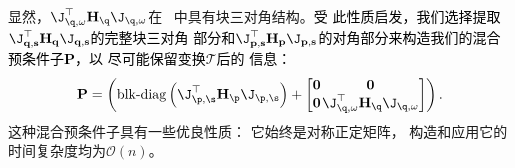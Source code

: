 显然，$ \J_{\q,\omega}^\top \mathbf{H}_\q \J_{\q, \omega}$在
~中具有块三对角结构。\textcolor{black}{受
此性质启发，我们选择提取$\J_{\mathbf{q, s}}^{\top} \mathbf{H}_{\mathbf{q}} \J_{\mathbf{q, s}}$的完整块三对角
部分和$\J^{\top}_{\mathbf{p, s}} \mathbf{H}_{\mathbf{p}} \J_{\mathbf{p, s}}$的对角部分来构造我们的混合预条件子$\mathbf P$，以
尽可能保留变换$\mathcal T$后的
信息：}
\begin{equation}
  \setlength{\arraycolsep}{0.5pt}
  \mathbf{P} =\left(\operatorname{blk-diag}\left(\J_{\p, \s}^\top \mathbf{H}_{\p} \J_{\p, \s}\right) + \begin{bmatrix} \mathbf{0} & \mathbf{0} \\ \mathbf{0}  & \J_{\q,\omega}^\top \mathbf{H}_\q \J_{\q, \omega} \end{bmatrix}\right).
  \label{eq:preconditioner_structure}
\end{equation}
这种混合预条件子具有一些优良性质：
它始终是对称正定矩阵，
构造和应用它的时间复杂度均为$\mathcal{O}(n)$。
{\color{black}
}

